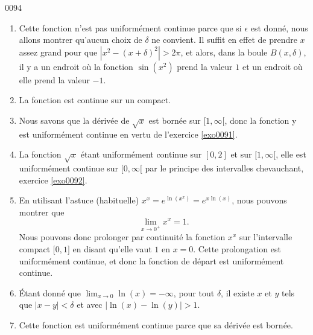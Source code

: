 \begin{corrige}{0094}
\begin{enumerate}
\item
Cette fonction n'est pas uniformément continue parce que si $\epsilon$ est donné, nous allons montrer qu'aucun choix de $\delta$ ne convient. Il suffit en effet de prendre $x$ assez grand pour que $| x^2-(x+\delta)^2 |>2\pi$, et alors, dans la boule $B(x,\delta)$, il y a un endroit où la fonction $\sin(x^2)$ prend la valeur $1$ et un endroit où elle prend la valeur $-1$.

\item
La fonction est continue sur un compact.

\item
 Nous savons que la dérivée de $\sqrt{x}$ est bornée sur $\mathopen[1,\infty[$, donc la fonction y est uniformément continue en vertu de l'exercice \ref{exo0091}.

\item
La fonction $\sqrt{x}$ étant uniformément continue sur $[0,2]$ et sur $\mathopen[1,\infty[$, elle est uniformément continue sur $\mathopen[0,\infty[$ par le principe des intervalles chevauchant, exercice \ref{exo0092}.

\item
En utilisant l'astuce (habituelle) $x^x= e^{\ln(x^x)}= e^{x\ln(x)}$, nous pouvons montrer que
\begin{equation}
	\lim_{x\to 0^+} x^x=1.
\end{equation}
Nous pouvons donc prolonger par continuité la fonction $x^x$ sur l'intervalle compact $\mathopen[0,1\mathclose]$ en disant qu'elle vaut $1$ en $x=0$. Cette prolongation est uniformément continue, et donc la fonction de départ est uniformément continue.

\item
Étant donné que $\lim_{x\to 0}\ln(x)=-\infty$, pour tout $\delta$, il existe $x$ et $y$ tels que $| x-y |<\delta$ et avec $| \ln(x)-\ln(y) |>1$.

\item
Cette fonction est uniformément continue parce que sa dérivée est bornée.

\end{enumerate}

\end{corrige}

